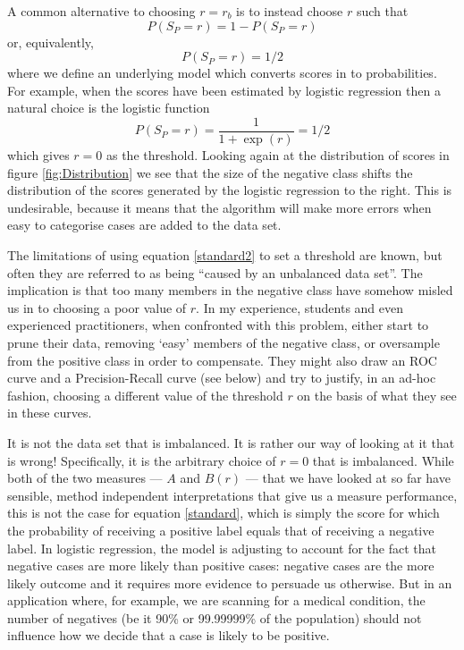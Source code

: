 \documentclass{article}
\begin{document}
A common alternative to choosing $r=r_b$ is to instead choose $r$ such that
 \begin{equation}
P(S_P = r) = 1 - P(S_P=r) \label{standard}
\end{equation}
or, equivalently,
\begin{equation}
P(S_P = r) = 1/2 \label{standard2}
\end{equation}
where we define an underlying model which converts scores in to probabilities. For example, when the scores have been estimated by logistic regression then a natural choice is the logistic function
\[
P(S_P = r) = \frac{1}{1+\exp(r)} = 1/2
\] 
which gives $r=0$ as the threshold. Looking again at the distribution of scores in figure \ref{fig:Distribution}  we see that the size of the negative class shifts the distribution of the scores generated by the logistic regression to the right. This is undesirable, because it means that the algorithm will make more errors when easy to categorise cases are added to the data set.

The limitations of using equation \ref{standard2} to set a threshold are known, but often they are referred to as being ``caused by an unbalanced data set''. The implication is that too many members in the negative class have somehow misled us in to choosing a poor value of $r$. In my experience, students and even experienced practitioners, when confronted with this problem, either start to prune their data, removing `easy' members of the negative class, or oversample from the positive class in order to compensate. They might also draw an ROC curve and a Precision-Recall curve (see below) and try to justify, in an ad-hoc fashion, choosing a different value of the threshold $r$ on the basis of what they see in these curves.

It is not the data set that is imbalanced. It is rather our way of looking at it that is wrong! Specifically, it is the arbitrary choice of $r=0$ that is imbalanced. While both of the two measures --- $A$ and $B(r)$ --- that we have looked at so far have sensible, method independent interpretations that give us a measure performance, this is not the case for equation \ref{standard}, which is simply the score for which the probability of receiving a positive label equals that of receiving a negative label. In logistic regression, the model is adjusting to account for the fact that negative cases are more likely than positive cases: negative cases are the more likely outcome and it requires more evidence to persuade us otherwise. But in an application where, for example, we are scanning for a medical condition, the number of negatives (be it 90\% or 99.99999\% of the population) should not influence how we decide that a case is likely to be positive. 
\end{document}
